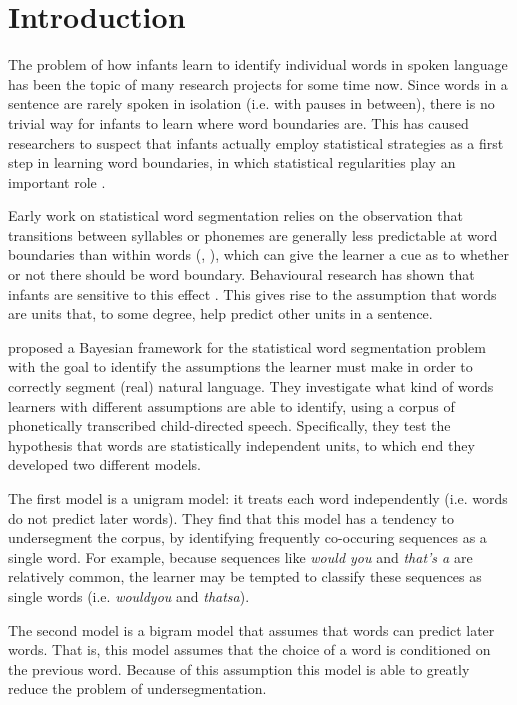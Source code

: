 \section{Introduction}

The problem of how infants learn to identify individual words in spoken language has been the topic of many research projects for some time now. Since words in a sentence are rarely spoken in isolation (i.e. with pauses in between), there is no trivial way for infants to learn where word boundaries are. This has caused researchers to suspect that infants actually employ statistical strategies as a first step in learning word boundaries, in which statistical regularities play an important role \cite{thiessen2003cues}.

Early work on statistical word segmentation relies on the observation that transitions between syllables or phonemes are generally less predictable at word boundaries than within words (\cite{harris1970phoneme}, \cite{saffran1996statistical}), which can give the learner a cue as to whether or not there should be word boundary. Behavioural research has shown that infants are sensitive to this effect \cite{saffran1996statistical} \cite{aslin1998computation}. This gives rise to the assumption that words are units that, to some degree, help predict other units in a sentence.

\cite{Goldwater200921} proposed a Bayesian framework for the statistical word segmentation problem with the goal to identify the assumptions the learner must make in order to correctly segment (real) natural language. They investigate what kind of words learners with different assumptions are able to identify, using a corpus of phonetically transcribed child-directed speech. Specifically, they test the hypothesis that words are statistically independent units, to which end they developed two different models.

The first model is a unigram model: it treats each word independently (i.e. words do not predict later words). They find that this model has a tendency to undersegment the corpus, by identifying frequently co-occuring sequences as a single word. For example, because sequences like \textit{would you} and \textit{that's a} are relatively common, the learner may be tempted to classify these sequences as single words (i.e. \textit{wouldyou} and \textit{thatsa}).

The second model is a bigram model that assumes that words can predict later words. That is, this model assumes that the choice of a word is conditioned on the previous word. Because of this assumption this model is able to greatly reduce the problem of undersegmentation.

